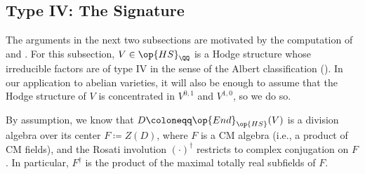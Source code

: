 \documentclass[../thesis.tex]{subfiles}
\begin{document}
\subsection{Type IV: The Signature} \label{subsec:signature}
The arguments in the next two subsections are motivated by the computation of \cite[Lemma~4.2]{yu-mumford-tate-cm} and \cite[Proposition~1.1]{yanai-degenerate-cm-type}. For this subsection, $V\in\op{HS}_\QQ$ is a Hodge structure whose irreducible factors are of type IV in the sense of the Albert classification (). In our application to abelian varieties, it will also be enough to assume that the Hodge structure of $V$ is concentrated in $V^{0,1}$ and $V^{1,0}$, so we do so.

By assumption, we know that $D\coloneqq\op{End}_{\op{HS}}(V)$ is a division algebra over its center $F\coloneqq Z(D)$, where $F$ is a CM algebra (i.e., a product of CM fields), and the Rosati involution $(\cdot)^\dagger$ restricts to complex conjugation on $F$. In particular, $F^\dagger$ is the product of the maximal totally real subfields of $F$.
\end{document}
